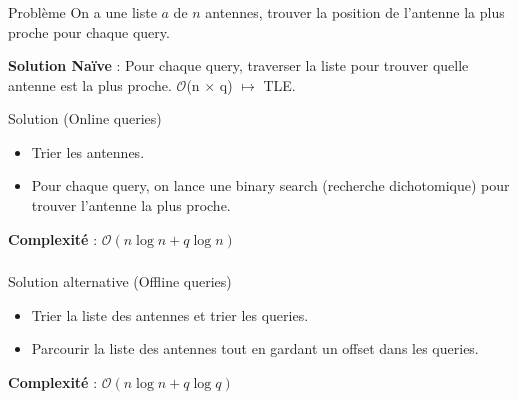 \begin{frame}
    \frametitle{\problemtitle}
    \begin{block}{Problème}
        On a une liste $a$ de $n$ antennes, trouver la position de l'antenne la plus proche pour chaque query.
    \end{block}
    \pause
    \textbf{Solution Naïve} : Pour chaque query, traverser la liste pour trouver quelle antenne est la plus proche.
    \pause
    $\mathcal{O}$(n $\times$ q) $\mapsto$ TLE.\\
    \pause \vspace{1em}
    \begin{block}{Solution (Online queries)}
        \begin{itemize}
            \item<+-> Trier les antennes.
            \item<+-> Pour chaque query, on lance une binary search (recherche dichotomique) pour trouver l'antenne la plus proche.
        \end{itemize}
        \pause
        \textbf{Complexité} : $\mathcal{O}(n \log n + q\log n)$
    \end{block}
\end{frame}

\begin{frame}
    \frametitle{\problemtitle}
    \begin{block}{Solution alternative (Offline queries)}
        \begin{itemize}
            \item Trier la liste des antennes et trier les queries.
            \item Parcourir la liste des antennes tout en gardant un offset dans les queries.
        \end{itemize}
        \pause
        \textbf{Complexité} : $\mathcal{O}(n \log n + q\log q)$
    \end{block}

\end{frame}